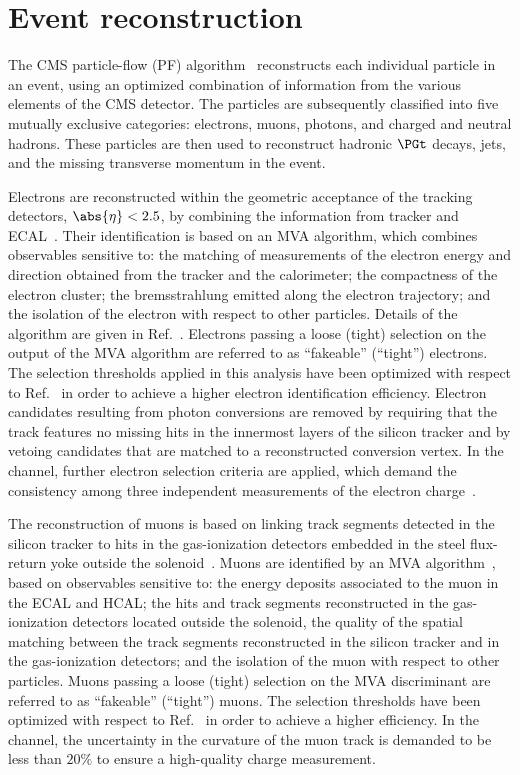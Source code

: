 \section{Event reconstruction}
\label{sec:eventReconstruction}

The CMS particle-flow (PF) algorithm~\cite{Sirunyan:2017ulk} reconstructs each individual particle in an event,
using an optimized combination of information from the various elements of the CMS detector.
The particles are subsequently classified into five mutually exclusive categories: 
electrons, muons, photons, and charged and neutral hadrons.
These particles are then used to reconstruct hadronic $\PGt$ decays, jets, and the missing transverse momentum in the event.

Electrons are reconstructed within the geometric acceptance of the tracking detectors, $\abs{\eta} < 2.5$,
by combining the information from tracker and ECAL~\cite{Khachatryan:2015hwa}.
Their identification is based on an MVA algorithm, which combines observables sensitive 
to: the matching of measurements of the electron energy and direction obtained from the tracker and the calorimeter;
the compactness of the electron cluster;
the bremsstrahlung emitted along the electron trajectory;
and the isolation of the electron with respect to other particles.
Details of the algorithm are given in Ref.~\cite{Sirunyan:2020icl}.
Electrons passing a loose (tight) selection on the output of the MVA algorithm are referred to as ``fakeable'' (``tight'') electrons.
The selection thresholds applied in this analysis have been optimized with respect to Ref.~\cite{Sirunyan:2020icl} in order to achieve a higher electron identification efficiency.
Electron candidates resulting from photon conversions are removed by requiring 
that the track features no missing hits in the innermost layers of the silicon tracker and by vetoing candidates that are matched to a reconstructed conversion vertex.
In the \twoLeptonssZeroTau channel, further electron selection criteria are applied,
which demand the consistency among three independent measurements of the electron charge~\cite{Khachatryan:2015hwa}.

The reconstruction of muons is based on linking track segments detected in the silicon tracker 
to hits in the gas-ionization detectors embedded in the steel flux-return yoke outside the solenoid~\cite{Sirunyan:2018}.
Muons are identified by an MVA algorithm~\cite{Sirunyan:2020icl}, based on observables sensitive 
to: the energy deposits associated to the muon in the ECAL and HCAL;
the hits and track segments reconstructed in the gas-ionization detectors located outside the solenoid,
the quality of the spatial matching between the track segments reconstructed in the silicon tracker and in the gas-ionization detectors;
and the isolation of the muon with respect to other particles.
Muons passing a loose (tight) selection on the MVA discriminant are referred to as ``fakeable'' (``tight'') muons.
The selection thresholds have been optimized with respect to Ref.~\cite{Sirunyan:2020icl} in order to achieve a higher efficiency.
In the \twoLeptonssZeroTau channel, the uncertainty in the curvature of the muon track is demanded to be less than $20\%$
to ensure a high-quality charge measurement.

